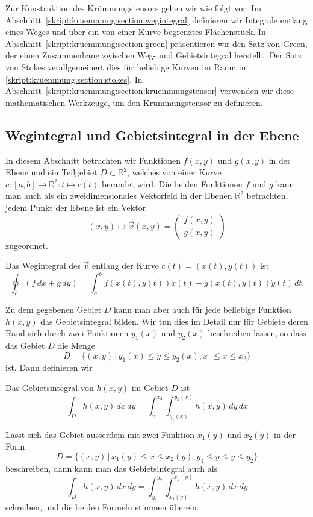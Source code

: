 Zur Konstruktion des Krümmungstensors gehen wir wie folgt vor.
Im Abschnitt~\ref{skript:kruemmung:section:wegintegral} definieren
wir Integrale entlang eines Weges und über ein von einer Kurve begrenztes
Flächenstück.
In Abschnitt~\ref{skript:kruemmung:section:green} präsentieren
wir den Satz von Green, der einen Zusammenhang zwischen Weg- und
Gebietsintegral herstellt.
Der Satz von Stokes verallgemeinert dies für beliebige Kurven
im Raum in \ref{skript:kruemmung:section:stokes}.
In Abschnitt~\ref{skript:kruemmung:section:kruemmungstensor}
verwenden wir diese mathematischen Werkzeuge, um den Krümmungstensor
zu definieren.

\subsection{Wegintegral und Gebietsintegral in der Ebene%
\label{skript:kruemmung:section:wegintegral}}
In diesem Abschnitt betrachten wir Funktionen $f(x,y)$ und $g(x,y)$
in der Ebene und ein Teilgebiet $D\subset \mathbb R^2$, welches
von einer Kurve $c\colon [a,b]\to\mathbb R^2\colon t\mapsto c(t)$
berandet wird.
Die beiden Funktionen $f$ und $g$ kann man auch als ein zweidimensionales
Vektorfeld in der Ebenen $\mathbb R^2$ betrachten, jedem Punkt der
Ebene ist ein Vektor 
\[
(x,y)\mapsto \vec{v}(x,y)=\begin{pmatrix}f(x,y)\\g(x,y)\end{pmatrix}
\]
zugeordnet.

\begin{definition}
Das Wegintegral des $\vec v$ entlang der Kurve $c(t)=(x(t),y(t))$ ist
\[
\oint_c (f\,dx + g\,dy)
= 
\int_a^b f(x(t),y(t)) \dot x(t) + g(x(t),y(t)) \dot y(t)\,dt.
\]
\end{definition}

Zu dem gegebenen Gebiet $D$ kann man aber auch für jede beliebige
Funktion $h(x,y)$ das Gebietsintegral bilden.
Wir tun dies im Detail nur für Gebiete deren Rand sich durch zwei
Funktionen $y_1(x)$ und $y_2(x)$ beschreiben lassen, so dass das
Gebiet $D$ die Menge
\[
D=\{ (x,y) \,|\, y_1(x) \le y \le y_2(x), x_1\le x\le x_2\}
\]
ist.
Dann definieren wir

\begin{definition}
Das Gebietsintegral von $h(x,y)$ im Gebiet $D$ ist
\[
\int_D h(x,y)\,dx\,dy = \int_{x_1}^{x_2} \int_{y_1(x)}^{y_2(x)} h(x,y)\,dy\,dx
\]
\end{definition}

Lässt sich das Gebiet ausserdem mit zwei Funktion $x_1(y)$ und $x_2(y)$
in der Form
\[
D=\{(x,y)\,|\, x_1(y)\le x\le x_2(y), y_1\le y\le y\le y_2\}
\]
beschreiben, dann kann man das Gebietsintegral auch als
\[
\int_Dh(x,y)\,dx\,dy
=
\int_{y_1}^{y_2}\int_{x_1(y)}^{x_2(y)} h(x,y)\,dx\,dy
\]
schreiben, und die beiden Formeln stimmen überein.

